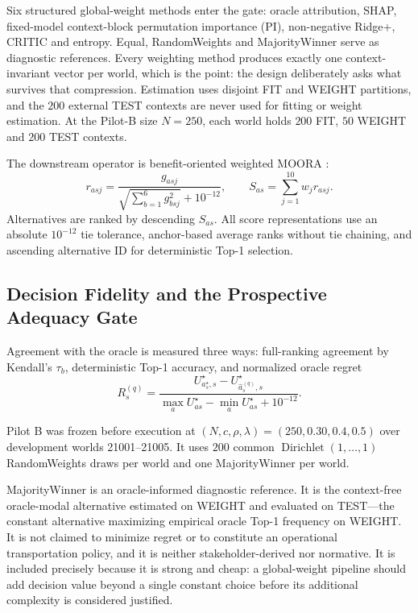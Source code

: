 \documentclass[runningheads,orivec]{llncs}
\newcommand{\MOORA}{MOORA}
\newcommand{\CRITIC}{CRITIC}
\begin{document}
Six structured global-weight methods enter the gate: oracle attribution, SHAP,
fixed-model context-block permutation importance (PI), non-negative Ridge+, \CRITIC{}
and entropy. Equal, RandomWeights and MajorityWinner serve as diagnostic references.
Every weighting method produces exactly one context-invariant vector per world, which
is the point: the design deliberately asks what survives that compression. Estimation
uses disjoint FIT and WEIGHT partitions, and the $200$ external TEST contexts are never
used for fitting or weight estimation. At the Pilot-B size $N=250$, each world holds
$200$ FIT, $50$ WEIGHT and $200$ TEST contexts.

The downstream operator is benefit-oriented weighted \MOORA{} \cite{brauers2006moora}:
\begin{equation}
r_{asj}=\frac{g_{asj}}{\sqrt{\sum_{b=1}^{6}g_{bsj}^2}+10^{-12}},
\qquad
S_{as}=\sum_{j=1}^{10}w_j r_{asj}.
\label{eq:moora}
\end{equation}
Alternatives are ranked by descending $S_{as}$. All score representations use an
absolute $10^{-12}$ tie tolerance, anchor-based average ranks without tie chaining, and
ascending alternative ID for deterministic Top-1 selection.

\subsection{Decision Fidelity and the Prospective Adequacy Gate}
\label{sec:gate}

Agreement with the oracle is measured three ways: full-ranking agreement by Kendall's
$\tau_b$, deterministic Top-1 accuracy, and normalized oracle regret
\begin{equation}
R_s^{(q)}=
\frac{U_{a_s^\star,s}^{\star}-U_{\hat a_s^{(q)},s}^{\star}}
{\max_a U_{as}^{\star}-\min_a U_{as}^{\star}+10^{-12}}.
\label{eq:regret}
\end{equation}

Pilot B was frozen before execution at $(N,c,\rho,\lambda)=(250,0.30,0.4,0.5)$ over
development worlds 21001--21005. It uses $200$ common
$\operatorname{Dirichlet}(1,\ldots,1)$ RandomWeights draws per world and one
MajorityWinner per world.

MajorityWinner is an oracle-informed diagnostic reference. It is the context-free
oracle-modal alternative estimated on WEIGHT and evaluated on TEST---the constant
alternative maximizing empirical oracle Top-1 frequency on WEIGHT. It is not claimed to
minimize regret or to constitute an operational transportation policy, and it is
neither stakeholder-derived nor normative. It is included precisely because it is
strong and cheap: a global-weight pipeline should add decision value beyond a single
constant choice before its additional complexity is considered justified.
\end{document}
